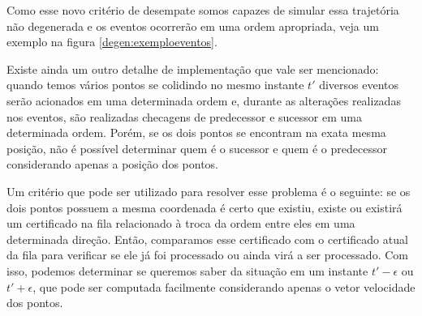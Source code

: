 Como esse novo critério de desempate somos capazes de simular essa
trajetória não degenerada e os eventos ocorrerão em uma ordem
apropriada, veja um exemplo na figura \ref{degen:exemploeventos}.



Existe ainda um outro detalhe de implementação que vale ser
mencionado: quando temos vários pontos se colidindo no mesmo
instante $t'$ diversos eventos serão acionados em uma determinada
ordem e, durante as alterações realizadas nos eventos, são
realizadas checagens de predecessor e sucessor em uma determinada
ordem. Porém, se os dois pontos se encontram na exata mesma posição,
não é possível determinar quem é o sucessor e quem é o predecessor
considerando apenas a posição dos pontos.

Um critério que pode ser utilizado para resolver esse problema é o
seguinte: se os dois pontos possuem a mesma coordenada é certo que
existiu, existe ou existirá um certificado na fila relacionado à
troca da ordem entre eles em uma determinada direção. Então,
comparamos esse certificado com o certificado atual da fila para
verificar se ele já foi processado ou ainda virá a ser processado.
Com isso, podemos determinar se queremos saber da situação em um
instante $t' - \epsilon$ ou $t' + \epsilon$, que pode ser computada
facilmente considerando apenas o vetor velocidade dos pontos.
